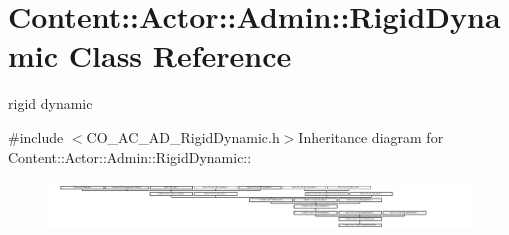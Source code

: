 \hypertarget{classContent_1_1Actor_1_1Admin_1_1RigidDynamic}{
\section{Content::Actor::Admin::RigidDynamic Class Reference}
\label{classContent_1_1Actor_1_1Admin_1_1RigidDynamic}
}


rigid dynamic  


{\ttfamily \#include $<$CO\_\-AC\_\-AD\_\-RigidDynamic.h$>$}Inheritance diagram for Content::Actor::Admin::RigidDynamic::\begin{figure}[H]
\begin{center}
\leavevmode
\includegraphics[height=1.33606cm]{classContent_1_1Actor_1_1Admin_1_1RigidDynamic}
\end{center}
\end{figure}
